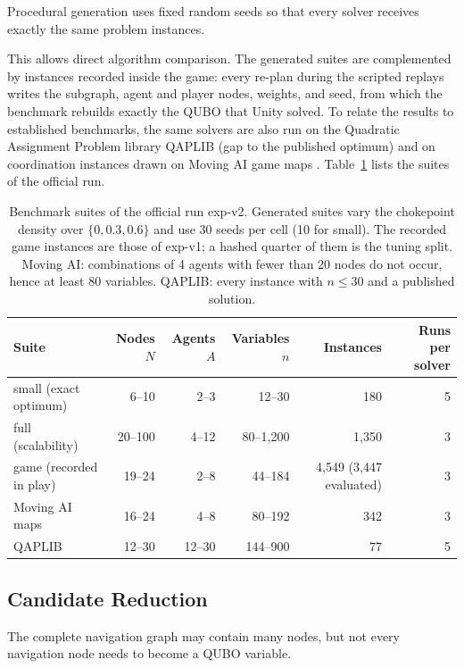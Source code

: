 \documentclass[12pt, a4paper]{article}
\begin{document}
Procedural generation uses fixed random seeds so that every solver receives exactly the same problem instances.

This allows direct algorithm comparison. The generated suites are complemented by instances recorded inside the game: every re-plan during the scripted replays writes the subgraph, agent and player nodes, weights, and seed, from which the benchmark rebuilds exactly the QUBO that Unity solved. To relate the results to established benchmarks, the same solvers are also run on the Quadratic Assignment Problem library QAPLIB \cite{Burkard1997} (gap to the published optimum) and on coordination instances drawn on Moving AI game maps \cite{Sturtevant2012}. Table~\ref{tab:suites} lists the suites of the official run.

\begin{table}[htbp]
\centering
\small
\begin{tabular}{lrrrrr}
\toprule
Suite & Nodes $N$ & Agents $A$ & Variables $n$ & Instances & Runs per solver \\
\midrule
small (exact optimum) & 6--10 & 2--3 & 12--30 & 180 & 5 \\
full (scalability) & 20--100 & 4--12 & 80--1{,}200 & 1{,}350 & 3 \\
game (recorded in play) & 19--24 & 2--8 & 44--184 & 4{,}549 (3{,}447 evaluated) & 3 \\
Moving AI maps & 16--24 & 4--8 & 80--192 & 342 & 3 \\
QAPLIB & 12--30 & 12--30 & 144--900 & 77 & 5 \\
\bottomrule
\end{tabular}
\caption{Benchmark suites of the official run exp-v2. Generated suites vary the chokepoint density over $\{0, 0.3, 0.6\}$ and use 30 seeds per cell (10 for small). The recorded game instances are those of exp-v1; a hashed quarter of them is the tuning split. Moving AI: combinations of 4 agents with fewer than 20 nodes do not occur, hence at least 80 variables. QAPLIB: every instance with $n\le30$ and a published solution.}
\label{tab:suites}
\end{table}

\subsection*{Candidate Reduction}

The complete navigation graph may contain many nodes, but not every navigation node needs to become a QUBO variable.
\end{document}
